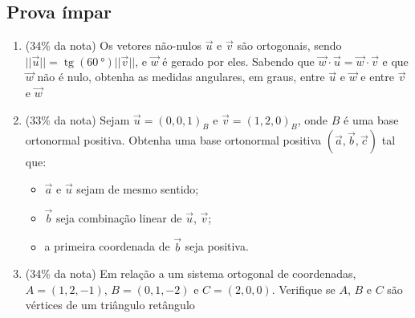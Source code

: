 \documentclass[12pt,a4paper,brazilian, fleqn]{article}
\DeclareMathOperator{\tg}{tg}
\newcommand{\ratio}[1]{(#1\% da nota)}
\renewcommand{\vec}[1]{\overrightarrow{#1}}
\begin{document}
\subsection*{Prova ímpar}
\begin{enumerate}
    \item \ratio{34} Os vetores não-nulos \(\vec{u}\) e \(\vec{v}\) são ortogonais, sendo \(||\vec{u}||=\tg{(\SI{60}{\degree})} ||\vec{v}||\), e
        \(\vec{w}\) é gerado por eles. Sabendo que \(\vec{w} \cdot \vec{u} = \vec{w} \cdot \vec{v} \) e que \(\vec{w}\)
        não é nulo, obtenha as medidas angulares, em graus, entre \(\vec{u}\) e \(\vec{w}\) e entre \(\vec{v}\) e
        \(\vec{w}\)

    \item \ratio{33} Sejam \(\vec{u}=(0,0,1)_B\) e \(\vec{v}=(1,2,0)_B\), onde \(B\) é uma base ortonormal positiva. Obtenha uma base
        ortonormal positiva \((\vec{a}, \vec{b}, \vec{c})\) tal que:

        \begin{itemize}
            \item \(\vec{a}\) e \(\vec{u}\) sejam de mesmo sentido;
            \item \(\vec{b}\) seja combinação linear de \(\vec{u}\), \(\vec{v}\);
            \item a primeira coordenada de \(\vec{b}\) seja positiva.
        \end{itemize}

    \item \ratio{34} Em relação a um sistema ortogonal de coordenadas, \(A=(1,2,-1)\), \(B=(0,1,-2)\) e \(C=(2,0,0)\).
        Verifique se \(A\), \(B\) e \(C\) são vértices de um triângulo retângulo
\end{enumerate}
\end{document}
